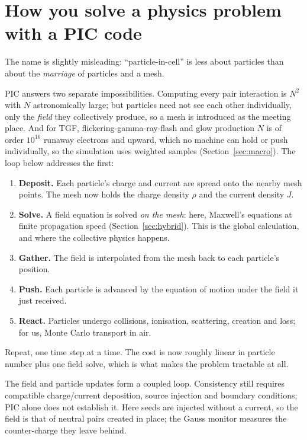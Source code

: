 \documentclass[11pt]{article}
\begin{document}
\section{How you solve a physics problem with a PIC code}
\label{sec:pic}

The name is slightly misleading: ``particle-in-cell'' is less about particles
than about the \emph{marriage} of particles and a mesh.

PIC answers two separate impossibilities. Computing every pair interaction is
$N^2$ with $N$ astronomically large; but particles need not see each other
individually, only the \emph{field} they collectively produce, so a mesh is
introduced as the meeting place. And for TGF, flickering-gamma-ray-flash and
glow production $N$ is of order $10^{16}$ runaway electrons and upward, which
no machine can hold or push individually,
so the simulation uses weighted samples
(Section~\ref{sec:macro}). The loop below addresses the first:

\begin{enumerate}\itemsep2pt
  \item \textbf{Deposit.} Each particle's charge and current are spread onto the
    nearby mesh points. The mesh now holds the charge density $\rho$ and the
    current density $J$.
  \item \textbf{Solve.} A field equation is solved \emph{on the mesh}: here,
    Maxwell's equations at finite propagation speed (Section~\ref{sec:hybrid}).
    This is the global calculation, and where the collective physics happens.
  \item \textbf{Gather.} The field is interpolated from the mesh back to each
    particle's position.
  \item \textbf{Push.} Each particle is advanced by the equation of motion under
    the field it just received.
  \item \textbf{React.} Particles undergo collisions, ionisation, scattering,
    creation and loss; for us, Monte Carlo transport in air.
\end{enumerate}

Repeat, one time step at a time. The cost is now roughly linear in particle
number plus one field solve, which is what makes the problem tractable at all.

The field and particle updates form a coupled loop. Consistency still requires
compatible charge/current deposition, source injection and boundary conditions;
PIC alone does not establish it. Here seeds are injected without a current, so
the field is that of neutral pairs created in place; the Gauss monitor measures
the counter-charge they leave behind.
\end{document}

